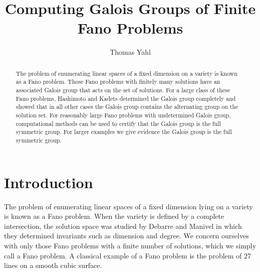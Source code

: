 \documentclass[12pt]{amsart}
\title{Computing Galois Groups of Finite Fano Problems}
\author[T.~Yahl]{Thomas Yahl}
\theoremstyle{definition}
\begin{document}
%
%
%
%
%
%
%



\begin{abstract}
The problem of enumerating linear spaces of a fixed dimension on a variety is known as a Fano problem. Those Fano problems with finitely many solutions have an associated Galois group that acts on the set of solutions. For a large class of these Fano problems, Hashimoto and Kadets determined the Galois group completely and showed that in all other cases the Galois group contains the alternating group on the solution set. For reasonably large Fano problems with undetermined Galois group, computational methods can be used to certify that the Galois group is the full symmetric group. For larger examples we give evidence the Galois group is the full symmetric group.
\end{abstract}

\maketitle

\section{Introduction}
%
The problem of enumerating linear spaces of a fixed dimension lying on a variety is known as a Fano problem. When the variety is defined by a complete intersection, the solution space was studied by Debarre and Manivel \cite{DM} in which they determined invariants such as dimension and degree. We concern ourselves with only those Fano problems with a finite number of solutions, which we simply call a Fano problem. A classical example of a Fano problem is the problem of 27 lines on a smooth cubic surface.
\end{document}
